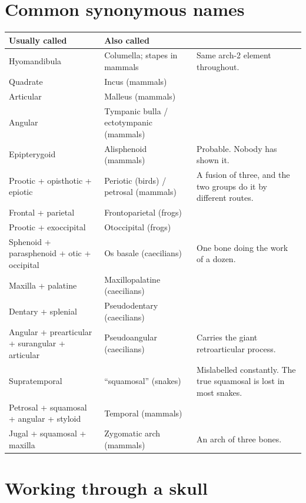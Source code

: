 \documentclass[11pt]{article}
\begin{document}
\section{Common synonymous names}

\begingroup\footnotesize
\begin{xltabular}{\linewidth}{L{4.5cm} L{4.5cm} X}
\toprule
\textbf{Usually called} & \textbf{Also called} & \\
\midrule
\endhead
Hyomandibula & Columella; stapes in mammals & Same arch-2 element throughout. \\
Quadrate & Incus (mammals) & \\
Articular & Malleus (mammals) & \\
Angular & Tympanic bulla / ectotympanic (mammals) & \\
Epipterygoid & Alisphenoid (mammals) & Probable. Nobody has shown it. \\
Prootic + opisthotic + epiotic & Periotic (birds) / petrosal (mammals) & A
  fusion of three, and the two groups do it by different routes. \\
Frontal + parietal & Frontoparietal (frogs) & \\
Prootic + exoccipital & Otoccipital (frogs) & \\
Sphenoid + parasphenoid + otic + occipital & Os basale (caecilians) &
  One bone doing the work of a dozen. \\
Maxilla + palatine & Maxillopalatine (caecilians) & \\
Dentary + splenial & Pseudodentary (caecilians) & \\
Angular + prearticular + surangular + articular & Pseudoangular (caecilians) &
  Carries the giant retroarticular process. \\
Supratemporal & ``squamosal'' (snakes) & Mislabelled constantly. The true
  squamosal is lost in most snakes. \\
Petrosal + squamosal + angular + styloid & Temporal (mammals) & \\
Jugal + squamosal + maxilla & Zygomatic arch (mammals) & An arch of three
bones. \\
\bottomrule
\end{xltabular}\endgroup


\clearpage
\section{Working through a skull}
\end{document}
